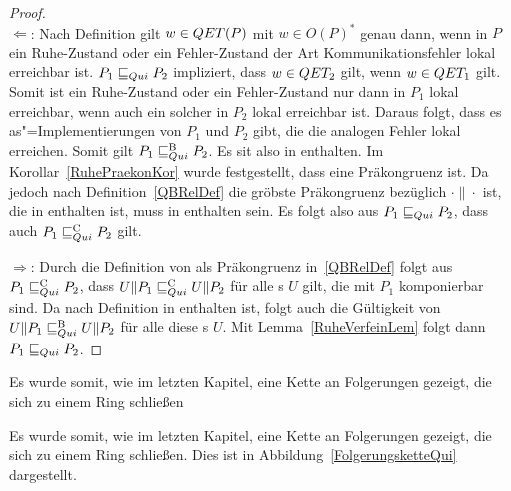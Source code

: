 \begin{proof}\mbox{}\\
  \glqq$\Leftarrow$\grqq{}: Nach Definition gilt $w\in QET (P)$ mit $w\in
  O(P)^*$ genau dann, wenn in $P$ ein Ruhe-Zustand oder ein Fehler-Zustand der
  Art Kommunikationsfehler lokal erreichbar ist. $P_1 \sqsubseteq  _{Qui} P_2$ impliziert,
  dass $w\in QET _2$ gilt, wenn $w\in QET _1$ gilt. Somit ist ein Ruhe-Zustand
  oder ein Fehler-Zustand nur dann in $P_1$ lokal erreichbar, wenn auch ein
  solcher in $P_2$ lokal erreichbar ist. Daraus folgt, dass es
  as"=Implementierungen von $P_1$ und $P_2$ gibt, die die analogen Fehler lokal
  erreichen. Somit gilt $P_1 \sqsubseteq  _{Qui}^\mathrm{B} P_2$. Es sit also \QRel{} in \QBRel{}
  enthalten. Im Korollar~\ref{RuhePraekonKor} wurde festgestellt, dass \QRel{}
  eine Präkongruenz ist. Da jedoch \QCRel{} nach Definition~\ref{QBRelDef} die
  gröbste Präkongruenz bezüglich $\cdot\|\cdot$ ist, die in \QBRel{} enthalten
  ist, muss \QRel{} in \QCRel{} enthalten sein. Es folgt also aus $P_1 \sqsubseteq  _{Qui}
  P_2$, dass auch $P_1 \sqsubseteq  _{Qui}^\mathrm{C} P_2$ gilt.

  \glqq$\Rightarrow$\grqq{}: Durch die Definition von \QCRel{} als Präkongruenz
  in~\ref{QBRelDef} folgt aus $P_1 \sqsubseteq  _{Qui}^\mathrm{C} P_2$, dass $U\|P_1 \sqsubseteq  _{Qui}^\mathrm{C} U\|P_2$ für
  alle \MEIO{}s $U$ gilt, die mit $P_1$ komponierbar sind. Da \QCRel{} nach
  Definition in \QBRel{} enthalten ist, folgt auch die Gültigkeit von
  $U\|P_1 \sqsubseteq  _{Qui}^\mathrm{B} U\|P_2$ für alle diese \MEIO{}s $U$. Mit
  Lemma~\ref{RuheVerfeinLem} folgt dann $P_1 \sqsubseteq  _{Qui} P_2$.
\end{proof}

Es wurde somit, wie im letzten Kapitel, eine Kette an Folgerungen gezeigt, die
sich zu einem Ring schließen

Es wurde somit, wie im letzten Kapitel, eine Kette an Folgerungen gezeigt, die
sich zu einem Ring schließen. Dies ist in Abbildung~\ref{FolgerungsketteQui}
dargestellt.

